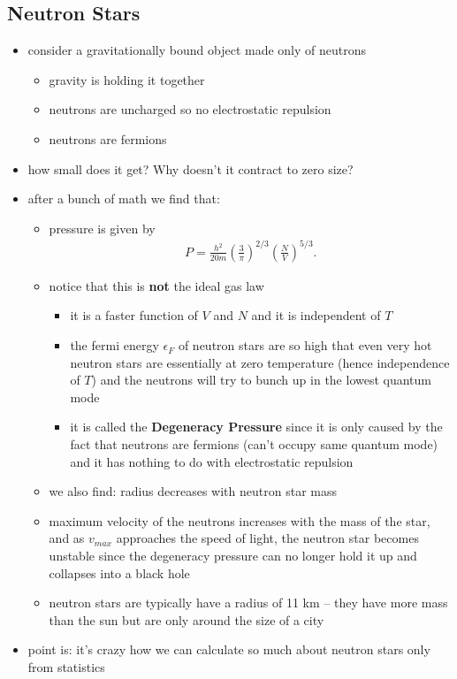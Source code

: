 \documentclass[10pt]{article}
\begin{document}
\subsection{Neutron Stars}
\begin{itemize}
    \item consider a gravitationally bound object made only of neutrons 
        \begin{itemize}
            \item gravity is holding it together 
            \item neutrons are uncharged so no electrostatic repulsion 
            \item neutrons are fermions 
        \end{itemize}
    \item how small does it get? Why doesn't it contract to zero size?
    \item after a bunch of math we find that:
        \begin{itemize}
            \item pressure is given by 
                \begin{gather*}
                    P = \frac{h^2}{20m} \left( \frac{3}{\pi} \right)^{2 / 3} \left( \frac{N}{V} \right)^{5 / 3}
                .\end{gather*}
            \item notice that this is \textbf{not} the ideal gas law 
                \begin{itemize}
                    \item it is a faster function of $V$ and $N$ and it is independent of $T$ 
                    \item the fermi energy $\epsilon_F$ of neutron stars are so high that even very hot neutron stars are essentially at zero temperature (hence independence of $T$) and the neutrons will try to bunch up in the lowest quantum mode
                    \item it is called the \textbf{Degeneracy Pressure} since it is only caused by the fact that neutrons are fermions (can't occupy same quantum mode) and it has nothing to do with electrostatic repulsion
                \end{itemize}
            \item we also find: radius decreases with neutron star mass
            \item maximum velocity of the neutrons increases with the mass of the star, and as $v_{max}$ approaches the speed of light, the neutron star becomes unstable since the degeneracy pressure can no longer hold it up and collapses into a black hole
            \item neutron stars are typically have a radius of 11 km -- they have more mass than the sun but are only around the size of a city
        \end{itemize}
    \item point is: it's crazy how we can calculate so much about neutron stars only from statistics
\end{itemize}
\end{document}
